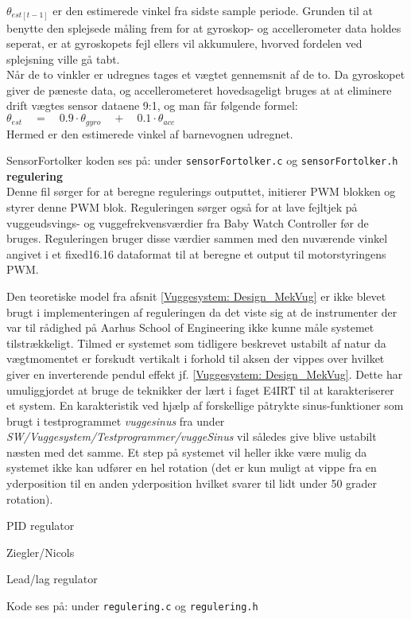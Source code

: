 ${ \theta  }_{ est\left[ t-1 \right]  }$ er den estimerede vinkel fra sidste sample periode. Grunden til at benytte den splejsede måling frem for at gyroskop- og accellerometer data holdes seperat, er at gyroskopets fejl ellers vil akkumulere, hvorved fordelen ved splejsning ville gå tabt.\\
Når de to vinkler er udregnes tages et vægtet gennemsnit af de to. Da gyroskopet giver de pæneste data, og accellerometeret hovedsageligt bruges at at eliminere drift vægtes sensor dataene 9:1, og man får følgende formel:\\
	${ \theta  }_{ est }\quad =\quad 0.9\cdot { \theta  }_{ gyro }\quad +\quad 0.1\cdot { \theta  }_{ acc }$ \\
Hermed er den estimerede vinkel af barnevognen udregnet.

SensorFortolker koden ses på: \citep{cd} under \verb+sensorFortolker.c+ og \verb+sensorFortolker.h+\\

\textbf{regulering}\label{vuggesystem_impl:regulering}  \\
Denne fil sørger for at beregne regulerings outputtet, initierer PWM blokken og styrer denne PWM blok. Reguleringen sørger også for at lave fejltjek på vuggeudsvings- og vuggefrekvensværdier fra Baby Watch Controller før de bruges. Reguleringen bruger disse værdier sammen med den nuværende vinkel angivet i et fixed16.16 dataformat til at beregne et output til motorstyringens PWM.

Den teoretiske model fra afsnit \vref{Vuggesystem: Design_MekVug} er ikke blevet brugt i implementeringen af reguleringen da det viste sig at de instrumenter der var til rådighed på Aarhus School of Engineering ikke kunne måle systemet tilstrækkeligt. Tilmed er systemet som tidligere beskrevet ustabilt af natur da vægtmomentet er forskudt vertikalt i forhold til aksen der vippes over hvilket giver en inverterende pendul effekt jf. \vref{Vuggesystem: Design_MekVug}. Dette har umuliggjordet at bruge de teknikker der lært i faget E4IRT til at karakteriserer et system. En karakteristik ved hjælp af forskellige påtrykte sinus-funktioner som brugt i testprogrammet \textit{vuggesinus} fra \citep{cd} under \textit{SW/Vuggesystem/Testprogrammer/vuggeSinus} vil således give blive ustabilt næsten med det samme. Et step på systemet vil heller ikke være mulig da systemet ikke kan udfører en hel rotation (det er kun muligt at vippe fra en yderposition til en anden yderposition hvilket svarer til lidt under 50 grader rotation). 

PID regulator

Ziegler/Nicols

Lead/lag regulator


Kode ses på: \citep{cd} under \verb+regulering.c+ og \verb+regulering.h+\\







\newpage